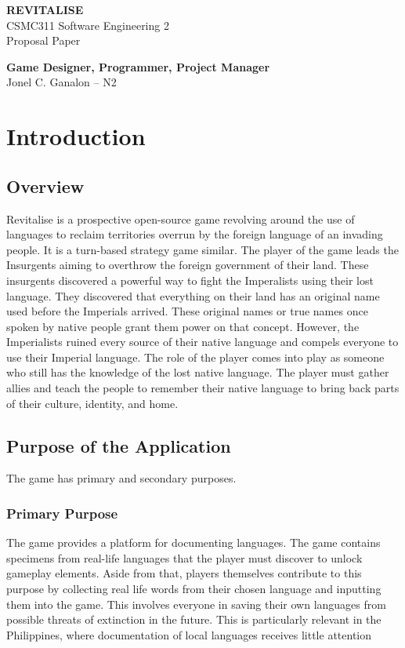 \documentclass[11pt]{article}
\begin{document}
\begin{titlepage}
  \thispagestyle{fancy}

  \vspace*{4cm}
  \centering
    \vfill
    {\LARGE \textbf{REVITALISE}} \\
    \vspace{0.5cm}
    CSMC311 Software Engineering 2 \\
    Proposal Paper
    
    \vfill

    \textbf{Game Designer, Programmer, Project Manager} \\
    Jonel C. Ganalon -- N2

    \vspace{1cm}
    
    \vfill 
\end{titlepage}

\section{Introduction}
\subsection{Overview}
Revitalise is a prospective open-source game revolving around the use of languages to reclaim territories overrun by the foreign language of an invading people. It is a turn-based strategy game similar. The player of the game leads the Insurgents aiming to overthrow the foreign government of their land. These insurgents discovered a powerful way to fight the Imperalists using their lost language. They discovered that everything on their land has an original name used before the Imperials arrived. These original names or true names once spoken by native people grant them power on that concept. However, the Imperialists ruined every source of their native language and compels everyone to use their Imperial language. The role of the player comes into play as someone who still has the knowledge of the lost native language. The player must gather allies and teach the people to remember their native language to bring back parts of their culture, identity, and home.


\subsection{Purpose of the Application}
The game has primary and secondary purposes.
\subsubsection{Primary Purpose}
The game provides a platform for documenting languages. The game contains specimens from real-life languages that the player must discover to unlock gameplay elements. Aside from that, players themselves contribute to this purpose by collecting real life words from their chosen language and inputting them into the game. This involves everyone in saving their own languages from possible threats of extinction in the future. This is particularly relevant in the Philippines, where documentation of local languages receives little attention
\end{document}
